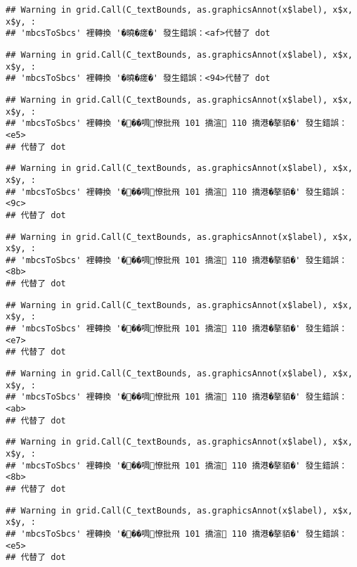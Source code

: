 \documentclass[
]{article}
\begin{document}
\begin{verbatim}
## Warning in grid.Call(C_textBounds, as.graphicsAnnot(x$label), x$x, x$y, :
## 'mbcsToSbcs' 裡轉換 '�曉�瘥�' 發生錯誤：<af>代替了 dot
\end{verbatim}

\begin{verbatim}
## Warning in grid.Call(C_textBounds, as.graphicsAnnot(x$label), x$x, x$y, :
## 'mbcsToSbcs' 裡轉換 '�曉�瘥�' 發生錯誤：<94>代替了 dot
\end{verbatim}

\begin{verbatim}
## Warning in grid.Call(C_textBounds, as.graphicsAnnot(x$label), x$x, x$y, :
## 'mbcsToSbcs' 裡轉換 '���啁憭批飛 101 撟渲 110 撟港�摮貊�' 發生錯誤：<e5>
## 代替了 dot
\end{verbatim}

\begin{verbatim}
## Warning in grid.Call(C_textBounds, as.graphicsAnnot(x$label), x$x, x$y, :
## 'mbcsToSbcs' 裡轉換 '���啁憭批飛 101 撟渲 110 撟港�摮貊�' 發生錯誤：<9c>
## 代替了 dot
\end{verbatim}

\begin{verbatim}
## Warning in grid.Call(C_textBounds, as.graphicsAnnot(x$label), x$x, x$y, :
## 'mbcsToSbcs' 裡轉換 '���啁憭批飛 101 撟渲 110 撟港�摮貊�' 發生錯誤：<8b>
## 代替了 dot
\end{verbatim}

\begin{verbatim}
## Warning in grid.Call(C_textBounds, as.graphicsAnnot(x$label), x$x, x$y, :
## 'mbcsToSbcs' 裡轉換 '���啁憭批飛 101 撟渲 110 撟港�摮貊�' 發生錯誤：<e7>
## 代替了 dot
\end{verbatim}

\begin{verbatim}
## Warning in grid.Call(C_textBounds, as.graphicsAnnot(x$label), x$x, x$y, :
## 'mbcsToSbcs' 裡轉換 '���啁憭批飛 101 撟渲 110 撟港�摮貊�' 發生錯誤：<ab>
## 代替了 dot
\end{verbatim}

\begin{verbatim}
## Warning in grid.Call(C_textBounds, as.graphicsAnnot(x$label), x$x, x$y, :
## 'mbcsToSbcs' 裡轉換 '���啁憭批飛 101 撟渲 110 撟港�摮貊�' 發生錯誤：<8b>
## 代替了 dot
\end{verbatim}

\begin{verbatim}
## Warning in grid.Call(C_textBounds, as.graphicsAnnot(x$label), x$x, x$y, :
## 'mbcsToSbcs' 裡轉換 '���啁憭批飛 101 撟渲 110 撟港�摮貊�' 發生錯誤：<e5>
## 代替了 dot
\end{verbatim}
\end{document}
